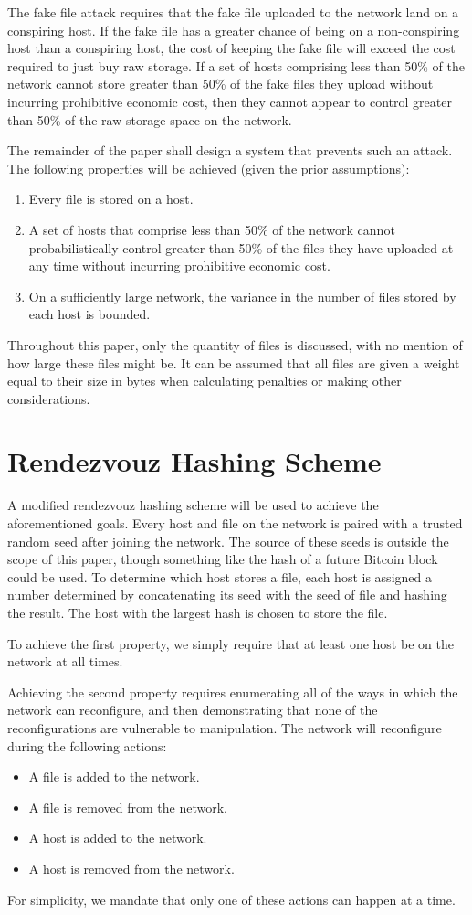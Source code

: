 \documentclass[twocolumn]{article}
\begin{document}
The fake file attack requires that the fake file uploaded to the network land on a conspiring host.
If the fake file has a greater chance of being on a non-conspiring host than a conspiring host, the cost of keeping the fake file will exceed the cost required to just buy raw storage.
If a set of hosts comprising less than 50\% of the network cannot store greater than 50\% of the fake files they upload without incurring prohibitive economic cost, then they cannot appear to control greater than 50\% of the raw storage space on the network.

The remainder of the paper shall design a system that prevents such an attack. The following properties will be achieved (given the prior assumptions):
\begin{enumerate}
	\item Every file is stored on a host.
	\item A set of hosts that comprise less than 50\% of the network cannot probabilistically control greater than 50\% of the files they have uploaded at any time without incurring prohibitive economic cost.
	\item On a sufficiently large network, the variance in the number of files stored by each host is bounded.
\end{enumerate}

Throughout this paper, only the quantity of files is discussed, with no mention of how large these files might be.
It can be assumed that all files are given a weight equal to their size in bytes when calculating penalties or making other considerations.

\section{Rendezvouz Hashing Scheme}
A modified rendezvouz hashing scheme will be used to achieve the aforementioned goals.
Every host and file on the network is paired with a trusted random seed after joining the network.
The source of these seeds is outside the scope of this paper, though something like the hash of a future Bitcoin block could be used.
To determine which host stores a file, each host is assigned a number determined by concatenating its seed with the seed of file and hashing the result.
The host with the largest hash is chosen to store the file.

To achieve the first property, we simply require that at least one host be on the network at all times.

Achieving the second property requires enumerating all of the ways in which the network can reconfigure, and then demonstrating that none of the reconfigurations are vulnerable to manipulation.
The network will reconfigure during the following actions:
\begin{itemize}
	\item A file is added to the network.
	\item A file is removed from the network.
	\item A host is added to the network.
	\item A host is removed from the network.
\end{itemize}
For simplicity, we mandate that only one of these actions can happen at a time.
\end{document}
